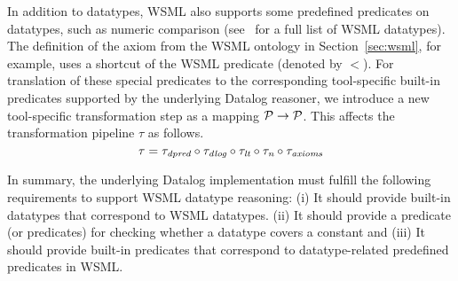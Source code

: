 In addition to datatypes, WSML also supports some predefined
predicates on datatypes, such as numeric comparison
(see~\cite{wsml-spec} for a full list of WSML datatypes). The
definition of the axiom
 from the WSML
ontology in Section~\ref{sec:wsml}, for example, uses a shortcut of
the WSML  predicate (denoted by $<$). For
translation of these special predicates to the corresponding
tool-specific built-in predicates supported by the underlying
Datalog reasoner, we introduce a new tool-specific transformation
step \transdpred as a mapping $\P \rightarrow \P$. This affects the
transformation pipeline $\tau$ as follows. \compress
\begin{displaymath}
    \tau = \transdpred \circ \transdlog \circ \translt \circ \transnorm \circ
    \transax \compress
\end{displaymath}

In summary, the underlying Datalog implementation must fulfill the
following requirements to support WSML datatype reasoning: (i) It
should provide built-in datatypes that correspond to WSML
datatypes. (ii) It should provide a predicate (or predicates) for
checking whether a datatype covers a constant and (iii) It should
provide built-in predicates that correspond to datatype-related
predefined predicates in WSML.

